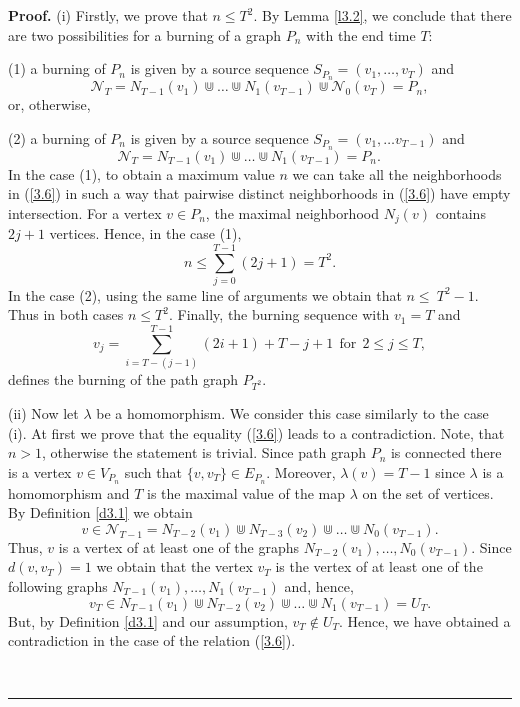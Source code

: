 \documentclass[a4paper, 11pt]{article}
\newenvironment{proof}[1][Proof]{\textbf{#1.} }{\ \rule{0.5em}{0.5em}}
\begin{document}
\begin{proof}
(i) Firstly, we prove that  $n\le T^2$. By  Lemma \ref{l3.2}, we conclude 
that there are two possibilities for a burning  of a graph $P_n$ with  the end time $T$:

(1) a  burning of $P_n$ is given by a source sequence $S_{P_n}=(v_1,\dots, v_T)$ and 
\begin{equation}\label{3.6}
 \mathcal N_T= N_{T-1}(v_1)\Cup \dots \Cup N_{1}(v_{T-1})\Cup \mathcal N_0(v_T)=P_n,
\end{equation}
or, otherwise,  

(2)  a burning of $P_n$ is given by a source sequence $S_{P_n}=(v_1,\dots v_{T-1})$ and 
\begin{equation}\label{3.7}
 \ \mathcal N_{T}=N_{T-1}(v_1)\Cup  \dots \Cup N_{1}(v_{T-1})=P_n. \ \ \ \ \ \ \ \ 
\end{equation}
In the case (1), to obtain a maximum value $n$ we can take all the neighborhoods  in (\ref{3.6}) in such a way that pairwise distinct  neighborhoods in (\ref{3.6}) have empty intersection.  For a vertex  $v\in P_n$,  the maximal neighborhood 
$N_j(v)$  contains $2j+1$ vertices.  Hence, in the case (1),
\begin{equation}\label{3.8}
n\le \sum_{j=0}^{T-1}(2j+1)=T^2.
\end{equation}
In the case (2), using the same line of arguments   we obtain  that $n\le~T^2-1$.  Thus in both cases  $n\le T^2$. Finally, the burning sequence with $v_1=T$ and 
$$
v_j=\sum_{i=T-(j-1)}^{T-1}(2 i+1)+T-j+1 \ \ \text{for} \ \ 2\le j \le T,
$$
 defines the burning of the path graph  $P_{T^2}$.

(ii)   Now let $\lambda$ be a homomorphism. We consider this case similarly to the case (i).  At first we prove that the  equality (\ref{3.6}) leads to a contradiction. Note, that $n>1$, otherwise the statement is trivial. Since path graph $P_n$ is connected there is a vertex $v\in V_{P_n}$ such that $\{v, v_T\} \in E_{P_n}$. Moreover, $\lambda(v)=T-1$ since $\lambda$ is a homomorphism and $T$ is the maximal value of the map $\lambda$ on the set of vertices.  By Definition \ref{d3.1} we obtain
\begin{equation*}
v\in \mathcal N_{T-1}=N_{T-2}(v_1)\Cup N_{T-3}(v_2)\Cup \dots \Cup N_0(v_{T-1}). 
\end{equation*}
Thus, $v$ is a vertex of at least one of the graphs 
$N_{T-2}(v_1), \dots , N_0(v_{T-1})$.
  Since $d(v,v_T)=1$ we obtain that the vertex $v_T$ 
is the vertex of at least one of  the following  graphs 
$
N_{T-1}(v_1), \dots , N_1(v_{T-1})
$
and, hence, 
\begin{equation*}
v_T\in N_{T-1}(v_1)\Cup  N_{T-2}(v_2) \Cup \dots \Cup N_1(v_{T-1})= U_{T}. 
\end{equation*}
But, by Definition \ref{d3.1} and our assumption, $v_T\notin U_T$. Hence, we have obtained a contradiction in the case of the relation  (\ref{3.6}). 



\end{proof}
\end{document}
